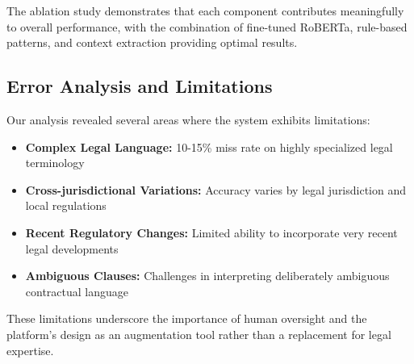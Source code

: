 The ablation study demonstrates that each component contributes meaningfully to overall performance, with the combination of fine-tuned RoBERTa, rule-based patterns, and context extraction providing optimal results.

\subsection{Error Analysis and Limitations}

Our analysis revealed several areas where the system exhibits limitations:

\begin{itemize}
    \item \textbf{Complex Legal Language:} 10-15\% miss rate on highly specialized legal terminology
    \item \textbf{Cross-jurisdictional Variations:} Accuracy varies by legal jurisdiction and local regulations
    \item \textbf{Recent Regulatory Changes:} Limited ability to incorporate very recent legal developments
    \item \textbf{Ambiguous Clauses:} Challenges in interpreting deliberately ambiguous contractual language
\end{itemize}

These limitations underscore the importance of human oversight and the platform's design as an augmentation tool rather than a replacement for legal expertise.
